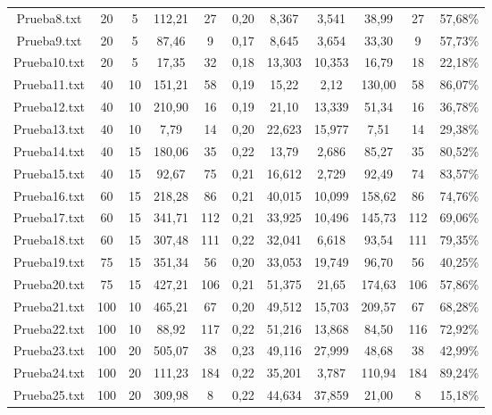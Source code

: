 \documentclass[11pt,letter]{article}
\begin{document}
\begin{table}[h]
{\begin{tabular}{ccccccc
  >{\columncolor[HTML]{B7E1CD}}c
  >{\columncolor[HTML]{B7E1CD}}c
  >{\columncolor[HTML]{FCE8B2}}c
  >{\columncolor[HTML]{B7E1CD}}c}
Prueba8.txt          & 20  & 5  &112,21 & 27 & 0,20 & 8,367 & \cellcolor[HTML]{F4C7C3}3,541 & 38,99 & 27  & 57,68\% \\
Prueba9.txt          & 20  & 5  & 87,46 &  9 & 0,17 & 8,645 & 3,654 & 33,30 & 9   & 57,73\% \\
Prueba10.txt         & 20  & 5  & 17,35 & 32 & 0,18 &13,303 & \cellcolor[HTML]{F4C7C3}10,353 & 16,79 & \cellcolor[HTML]{B7E1CD}18 & \cellcolor[HTML]{F4C7C3}22,18\% \\
Prueba11.txt         & 40  &10  &151,21 & 58 & 0,19 &15,22  & 2,12  &130,00 & 58  & 86,07\% \\
Prueba12.txt         & 40  &10  &210,90 & 16 & 0,19 &21,10  &13,339 & 51,34 & 16  & \cellcolor[HTML]{FCE8B2}36,78\% \\
Prueba13.txt         & 40  &10  &  7,79 & 14 & 0,20 &22,623 &15,977 &  7,51 & 14  & \cellcolor[HTML]{FCE8B2}29,38\% \\
Prueba14.txt         & 40  &15  &180,06 & 35 & 0,22 &13,79  & 2,686 & 85,27 & 35  & 80,52\% \\
Prueba15.txt         & 40  &15  & 92,67 & 75 & 0,21 &16,612 & \cellcolor[HTML]{F4C7C3}2,729 & 92,49 & \cellcolor[HTML]{B7E1CD}74 & 83,57\% \\
Prueba16.txt         & 60  &15  &218,28 & 86 & 0,21 &40,015 &10,099 &158,62 & 86  & 74,76\% \\
Prueba17.txt         & 60  &15  &341,71 &112 & 0,21 &33,925 &10,496 &145,73 &112  & 69,06\% \\
Prueba18.txt         & 60  &15  &307,48 &111 & 0,22 &32,041 & \cellcolor[HTML]{F4C7C3}6,618 & 93,54 &111  & 79,35\% \\
Prueba19.txt         & 75  &15  &351,34 & 56 & 0,20 &33,053 &19,749 & 96,70 & 56  & \cellcolor[HTML]{FCE8B2}40,25\% \\
Prueba20.txt         & 75  &15  &427,21 &106 & 0,21 &51,375 &21,65  &174,63 &106  & 57,86\% \\
Prueba21.txt         &100  &10  &465,21 & 67 & 0,20 &49,512 &15,703 &209,57 & 67  & 68,28\% \\
Prueba22.txt         &100  &10  & 88,92 &117 & 0,22 &51,216 &13,868 & 84,50 &\cellcolor[HTML]{B7E1CD}116& 72,92\% \\
Prueba23.txt         &100  &20  &505,07 & 38 & 0,23 &49,116 &27,999 & 48,68 & 38  & \cellcolor[HTML]{FCE8B2}42,99\% \\
Prueba24.txt         &100  &20  &111,23 &184 & 0,22 &35,201 & 3,787 &110,94 &184  & 89,24\% \\
Prueba25.txt         &100  &20  &309,98 &  8 & 0,22 &44,634 & \cellcolor[HTML]{F4C7C3}37,859 & 21,00 &  8  & \cellcolor[HTML]{F4C7C3}15,18\% \\

\end{tabular}}
\end{table}
\end{document}
